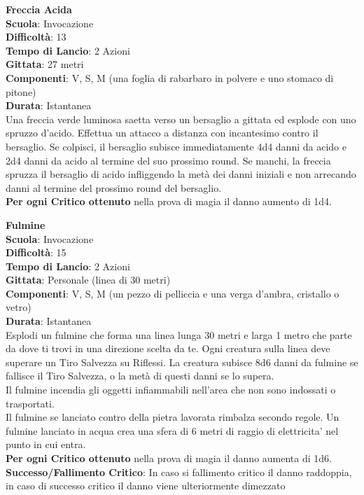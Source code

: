 \begin{multicols}{2}
\medskip\textbf{Freccia Acida}\\
\textbf{Scuola}: Invocazione\\
\textbf{Difficoltà}:  13\\
\textbf{Tempo di Lancio}: 2 Azioni\\
\textbf{Gittata}: 27 metri\\
\textbf{Componenti}: V, S, M (una foglia di rabarbaro in polvere e uno stomaco di pitone)\\
\textbf{Durata}: Istantanea\\
Una freccia verde luminosa saetta verso un bersaglio a gittata ed esplode con uno spruzzo d’acido. Effettua un attacco a distanza con incantesimo contro il bersaglio. Se colpisci, il bersaglio subisce immediatamente 4d4 danni da acido e 2d4 danni da acido al termine del suo prossimo round. Se manchi, la freccia spruzza il bersaglio di acido infliggendo la metà dei danni iniziali e non arrecando danni al termine del prossimo round del bersaglio.\\
\textbf{Per ogni Critico ottenuto} nella prova di magia il danno aumento di 1d4.

\medskip\textbf{Fulmine}\\
\textbf{Scuola}: Invocazione\\
\textbf{Difficoltà}:  15\\
\textbf{Tempo di Lancio}: 2 Azioni\\
\textbf{Gittata}: Personale (linea di 30 metri)\\
\textbf{Componenti}: V, S, M (un pezzo di pelliccia e una verga d’ambra, cristallo o vetro)\\
\textbf{Durata}: Istantanea\\
Esplodi un fulmine che forma una linea lunga 30 metri e larga 1 metro che parte da dove ti trovi in una direzione scelta da te. Ogni creatura sulla linea deve superare un Tiro Salvezza su Riflessi. La creatura subisce 8d6 danni da fulmine se fallisce il Tiro Salvezza, o la metà di questi danni se lo supera.\\
Il fulmine incendia gli oggetti infiammabili nell'area che non sono indossati o trasportati.\\
Il fulmine se lanciato contro della pietra lavorata rimbalza secondo regole. Un fulmine lanciato in acqua crea una sfera di 6 metri di raggio di elettricita' nel punto in cui entra.\\
\textbf{Per ogni Critico ottenuto} nella prova di magia il danno aumenta di 1d6.\\
\textbf{Successo/Fallimento Critico}: In caso si fallimento critico il danno raddoppia, in caso di successo critico il danno viene ulteriormente dimezzato


\end{multicols}
